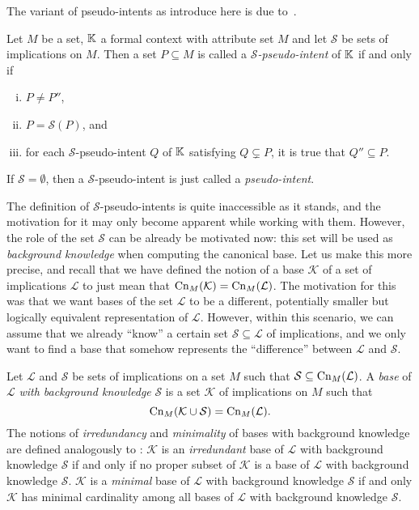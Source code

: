 The variant of pseudo-intents as introduce here is due to~\cite{stumme96attribute}.

\begin{Definition}
  \label{def:pseudo-intents}
  Let $M$ be a set, ${\mathbb{K}}$ a formal context with attribute set $M$ and let $\mathcal{S}$
  be sets of implications on $M$.  Then a set $P \subseteq M$ is called a
  \emph{$\mathcal{S}$-pseudo-intent} of ${\mathbb{K}}$ if and only if
  \begin{enumerate}[i. ]
  \item $P \neq P''$,
  \item $P = \mathcal{S}(P)$, and
  \item for each $\mathcal{S}$-pseudo-intent $Q$ of ${\mathbb{K}}$ satisfying $Q \subsetneq P$,
    it is true that $Q'' \subseteq P$.
  \end{enumerate}
  If $\mathcal{S} = \emptyset$, then a $\mathcal{S}$-pseudo-intent is just called a
  \emph{pseudo-intent}.
\end{Definition}

The definition of $\mathcal{S}$-pseudo-intents is quite inaccessible as it stands, and the
motivation for it may only become apparent while working with them.  However, the role of
the set $\mathcal{S}$ can be already be motivated now: this set will be used as
\emph{background knowledge} when computing the canonical base.  Let us make this more
precise, and recall that we have defined the notion of a base $\mathcal{K}$ of a set of
implications $\mathcal{L}$ to just mean that $\operatorname{Cn}_M(\mathcal{K}) = \operatorname{Cn}_M(\mathcal{L})$.
The motivation for this was that we want bases of the set $\mathcal{L}$ to be a different,
potentially smaller but logically equivalent representation of $\mathcal{L}$.  However,
within this scenario, we can assume that we already ``know'' a certain set $\mathcal{S}
\subseteq \mathcal{L}$ of implications, and we only want to find a base that somehow
represents the ``difference'' between $\mathcal{L}$ and $\mathcal{S}$.

\begin{Definition}
  \label{def:bases-with-background-knowledge}
  Let $\mathcal{L}$ and $\mathcal{S}$ be sets of implications on a set $M$ such that
  $\mathcal{S} \subseteq \operatorname{Cn}_M(\mathcal{L})$.  A \emph{base} of $\mathcal{L}$ \emph{with
    background knowledge} $\mathcal{S}$ is a set $\mathcal{K}$ of implications on $M$ such that
  \begin{equation*}
    \operatorname{Cn}_M(\mathcal{K} \cup \mathcal{S}) = \operatorname{Cn}_M(\mathcal{L}).
  \end{equation*}
  The notions of \emph{irredundancy} and \emph{minimality} of bases with background
  knowledge are defined analogously to : $\mathcal{K}$ is
  an \emph{irredundant} base of $\mathcal{L}$ with background knowledge $\mathcal{S}$ if
  and only if no proper subset of $\mathcal{K}$ is a base of $\mathcal{L}$ with background
  knowledge $\mathcal{S}$.  $\mathcal{K}$ is a \emph{minimal} base of $\mathcal{L}$ with
  background knowledge $\mathcal{S}$ if and only $\mathcal{K}$ has minimal cardinality
  among all bases of $\mathcal{L}$ with background knowledge $\mathcal{S}$.
\end{Definition}

